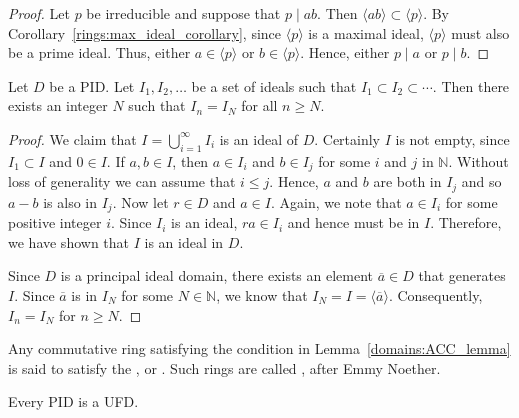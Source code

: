 \begin{proof}
Let $p$ be irreducible and suppose that $p \mid ab$.  Then $\langle
ab \rangle \subset \langle p \rangle$. By Corollary~\ref{rings:max_ideal_corollary}, since
$\langle p \rangle$ is a maximal ideal, $\langle p \rangle$ must also
be a prime ideal. Thus, either $a \in \langle p \rangle$ or $b \in
\langle p \rangle$.  Hence, either $p \mid a $ or $p \mid b$. 
\end{proof}


\begin{lemma}\label{domains:ACC_lemma}
Let $D$ be a PID.  Let $I_1, I_2, \ldots$ be a set of ideals such that 
$I_1 \subset I_2 \subset \cdots$. Then there exists an integer $N$
such that $I_n = I_N$ for all $n \geq N$.
\end{lemma}

 

\begin{proof}
We claim that $I= \bigcup_{i=1}^\infty I_i$ is an ideal of $D$. Certainly
$I$ is not empty, since $I_1 \subset I$ and $0 \in I$. If $a, b \in I$,
then $a \in I_i$ and $b \in I_j$ for some $i$ and $j$ in ${\mathbb N}$.
Without loss of generality we can assume that $i \leq j$.  Hence, $a$
and $b$ are both in $I_j$ and so $a - b$ is also in $I_j$. Now let $r
\in D$ and $a \in I$. Again, we note that $a \in I_i$ for some
positive integer $i$.  Since $I_i$ is an ideal, $ra \in I_i$ and hence
must be in $I$. Therefore, we have shown that $I$ is an ideal in $D$.



Since $D$ is a principal ideal domain, there exists an element 
$\overline{a} \in D$ that generates $I$. Since $\overline{a}$ is in 
$I_N$ for some $N \in {\mathbb N}$, we know that $I_N = I = \langle 
\overline{a} \rangle$. Consequently, $I_n = I_N$ for $n \geq N$.
\end{proof}		    
 

\medskip


Any commutative ring satisfying the condition in Lemma~\ref{domains:ACC_lemma} is said
to satisfy the , or .  Such rings are called , after Emmy Noether.  


\begin{theorem}
Every PID is a UFD.
\end{theorem}
 


